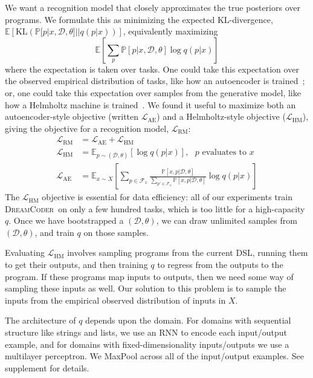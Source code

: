 \documentclass{article}
\newcommand{\system}{\textsc{DreamCoder}~}
\newcommand{\expect}{\mathds{E}} %
\newcommand{\probability}{\mathds{P}} %
\begin{document}
We want a recognition model that closely approximates the true posteriors over programs. We formulate this as minimizing the expected KL-divergence, $  \expect\left[\text{KL}\left(\probability[p|x,\mathcal{D},\theta]||q(p|x) \right) \right]$,
equivalently maximizing
\begin{equation*}
  \expect\left[\sum_p\probability[p|x,\mathcal{D},\theta]\log q(p|x) \right]
\end{equation*}
where the expectation is taken over tasks. One could take this expectation
over the observed empirical distribution of tasks,
like how an autoencoder is trained~\cite{hinton2006reducing}; or, one could take this expectation over samples from the generative model, like how a Helmholtz machine is trained~\cite{dayan1995helmholtz}.
We found it useful to maximize both an autoencoder-style objective (written $\mathcal{L}_{\text{AE}}$) and a Helmholtz-style objective ($\mathcal{L}_{\text{HM}}$), giving the  objective for a recognition model, $\mathcal{L}_{\text{RM}}$:
\begin{align}
\mathcal{L}_{\text{RM}}& = \mathcal{L}_\text{AE} + \mathcal{L}_\text{HM}\\
\mathcal{L}_{\text{HM}}& = \expect_{p\sim(\mathcal{D},\theta) }\left[\log q(p|x)\right],\text{ $p$ evaluates to $x$}\nonumber\\
\mathcal{L}_{\text{AE}}& = \expect_{x\sim X}\left[\sum_{p\in \mathcal{F}_x}
  \frac{\probability\left[x,p|\mathcal{D},\theta \right]}{\sum_{p'\in \mathcal{F}_x}\probability\left[x,p|\mathcal{D},\theta \right]}\log q(p|x)\right]\nonumber
\end{align}
The $\mathcal{L}_{\text{HM}}$ objective is essential for data efficiency:
all of our experiments train \system on only a few hundred tasks, which is too little for
a high-capacity $q$.
Once we have bootstrapped a $(\mathcal{D},\theta)$,
we can draw unlimited samples from $(\mathcal{D},\theta)$,
and train $q$ on those samples.

Evaluating $\mathcal{L}_{\text{HM}}$ involves sampling programs from
the current DSL, running them to get their outputs,
and then training $q$ to regress from the outputs to the program.
If these programs map inputs to outputs,
then we need some way of sampling these inputs as well.
Our solution to this problem is to sample the inputs
from the empirical observed distribution of inputs in $X$.

The architecture of $q$ depends upon the domain.
For domains with sequential structure like strings and lists,
we use an RNN to encode each input/output example,
and for domains with fixed-dimensionality inputs/outputs we use a multilayer perceptron.
We MaxPool across all of the input/output examples. See supplement for details.
\end{document}
